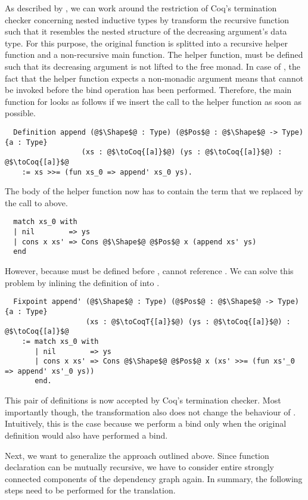 As described by \cite{Dylus:2018}, we can work around the restriction of Coq's termination checker concerning nested inductive types by transform the recursive function such that it resembles the nested structure of the decreasing argument's data type.
For this purpose, the original function is splitted into a recursive helper function and a non-recursive main function.
The helper function, must be defined such that its decreasing argument is not lifted to the free monad.
In case of , the fact that the helper function  expects a non-monadic argument means that  cannot be invoked before the bind operation has been performed.
Therefore, the main function for  looks as follows if we insert the call to the helper function as soon as possible.
\begin{verbatim}
  Definition append (@$\Shape$@ : Type) (@$Pos$@ : @$\Shape$@ -> Type) {a : Type}
                  (xs : @$\toCoq{[a]}$@) (ys : @$\toCoq{[a]}$@) : @$\toCoq{[a]}$@
    := xs >>= (fun xs_0 => append' xs_0 ys).
\end{verbatim}
The body of the helper function now has to contain the  term that we replaced by the call to  above.
\begin{verbatim}
  match xs_0 with
  | nil        => ys
  | cons x xs' => Cons @$\Shape$@ @$Pos$@ x (append xs' ys)
  end
\end{verbatim}
However, because  must be defined before ,  cannot reference .
We can solve this problem by inlining the definition of  into .
\begin{verbatim}
  Fixpoint append' (@$\Shape$@ : Type) (@$Pos$@ : @$\Shape$@ -> Type) {a : Type}
                   (xs : @$\toCoqT{[a]}$@) (ys : @$\toCoq{[a]}$@) : @$\toCoq{[a]}$@
    := match xs_0 with
       | nil        => ys
       | cons x xs' => Cons @$\Shape$@ @$Pos$@ x (xs' >>= (fun xs'_0 => append' xs'_0 ys))
       end.
\end{verbatim}
This pair of definitions is now accepted by Coq's termination checker.
Most importantly though, the transformation also does not change the behaviour of .
Intuitively, this is the case because we perform a bind only when the original definition would also have performed a bind.

Next, we want to generalize the approach outlined above.
Since function declaration can be mutually recursive, we have to consider entire strongly connected components of the dependency graph again.
In summary, the following steps need to be performed for the translation.

